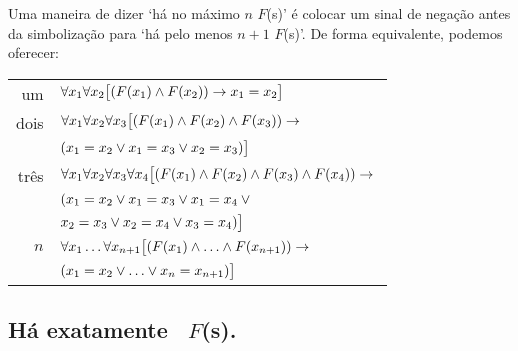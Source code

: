 Uma maneira de dizer `há no máximo $n$ $F$(s)' é colocar um sinal de negação antes da simbolização para `há pelo menos $n+1$ $F$(s)'. De forma equivalente, podemos oferecer: 
\begin{tabular*}{\textwidth}{rl}
um & $\forall x_1\forall x_2\bigl[(\mathord{F}(x_1) \wedge \mathord{F}(x_2)) \rightarrow x_1=x_2\bigr]$\\
dois & $\forall x_1\forall x_2\forall x_3\bigl[(\mathord{F}(x_1) \wedge \mathord{F}(x_2) \wedge \mathord{F}(x_3)) \rightarrow {}$\\ & $(x_1=x_2 \vee x_1=x_3 \vee x_2=x_3)\bigr]$\\
três & $\forall x_1\forall x_2\forall x_3\forall x_4\bigl[(\mathord{F}(x_1) \wedge \mathord{F}(x_2) \wedge \mathord{F}(x_3) \wedge \mathord{F}(x_4)) \rightarrow {}$\\
& $(x_1=x_2 \vee x_1=x_3 \vee x_1=x_4 \vee {}$\\
& $x_2=x_3 \vee x_2=x_4 \vee x_3=x_4)\bigr]$\\
$n$ & $\forall x_1\ldots\forall x_{n+1}
\bigl[(\mathord{F}(x_1) \wedge \ldots \wedge \mathord{F}(x_{n+1})) \rightarrow {}$\\
& $(x_1=x_2 \vee \ldots \vee x_n=x_{n+1})\bigr]$ 
\end{tabular*}


\subsection*{Há exatamente \blank\ $F$(s).}
\label{summary.exactly}

